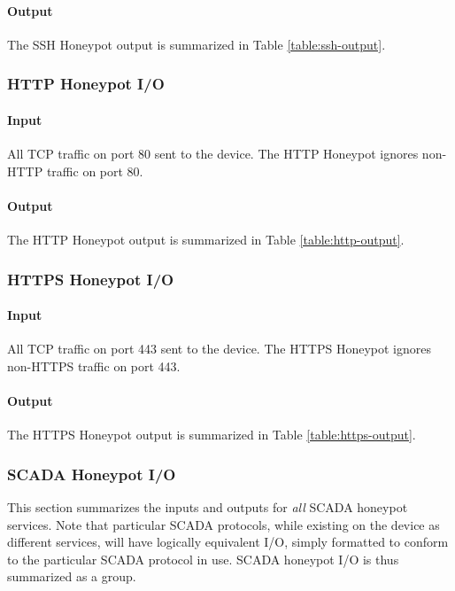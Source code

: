 \paragraph{Output}

The SSH Honeypot output is summarized in Table \ref{table:ssh-output}.

\subsubsection{HTTP Honeypot I/O}

\paragraph{Input}

All TCP traffic on port 80 sent to the device. The HTTP Honeypot ignores
non-HTTP traffic on port 80.

\paragraph{Output}

The HTTP Honeypot output is summarized in Table \ref{table:http-output}.

\subsubsection{HTTPS Honeypot I/O}

\paragraph{Input}

All TCP traffic on port 443 sent to the device. The HTTPS Honeypot ignores
non-HTTPS traffic on port 443.

\paragraph{Output}

The HTTPS Honeypot output is summarized in Table \ref{table:https-output}.

\subsubsection{SCADA Honeypot I/O}

This section summarizes the inputs and outputs for \textit{all} SCADA
honeypot services. Note that particular SCADA protocols, while existing on
the device as different services, will have logically equivalent I/O,
simply formatted to conform to the particular SCADA protocol in use. SCADA
honeypot I/O is thus summarized as a group.


